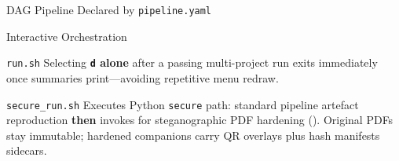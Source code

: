 \documentclass[
  ignorenonframetext,
]{beamer}
\begin{document}
\begin{frame}{DAG Pipeline Declared by
\texttt{pipeline.yaml}}
\begin{block}{Interactive Orchestration}
\begin{block}{\texttt{run.sh}}
Selecting \textbf{\texttt{d} alone} after a passing multi-project run
exits immediately once summaries print---avoiding repetitive menu
redraw.
\end{block}

\begin{block}{\texttt{secure\_run.sh}}
\protect{}\label{secure_run.sh}
Executes Python \texttt{secure} path: standard pipeline artefact
reproduction \textbf{then} invokes  for
steganographic PDF hardening ().
Original PDFs stay immutable; hardened companions carry QR overlays plus
hash manifests sidecars.
\end{block}
\end{block}
\end{frame}
\end{document}
